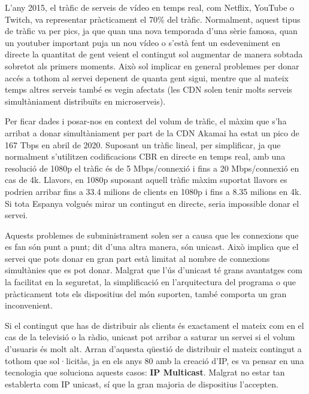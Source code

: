 {    L'any 2015, el tràfic de serveis de vídeo en temps real, com Netflix, YouTube o Twitch, va representar pràcticament el 70\% del tràfic. Normalment,
    aquest tipus de tràfic va per pics, ja que quan una nova temporada d'una sèrie famosa, quan un youtuber important puja un nou vídeo o s'està
    fent un esdeveniment en directe la quantitat de gent veient el contingut sol augmentar de manera sobtada sobretot als primers moments. Això sol implicar
    en general problemes per donar accés a tothom al servei depenent de quanta gent sigui, mentre que al mateix temps altres serveis també es vegin
    afectats (les \ac{CDN} solen tenir molts serveis simultàniament distribuïts en microserveis).
    
    Per ficar dades i posar-nos en context del volum de tràfic, el màxim que s'ha arribat a donar simultàniament per part de la \ac{CDN} Akamai
    ha estat un pico de 167 Tbps en abril de 2020. Suposant un tràfic lineal, per simplificar, ja que normalment s'utilitzen codificacions \ac{CBR}
    en directe en temps real, amb una resolució de 1080p el tràfic és de 5 Mbps/connexió i fins a 20 Mbps/connexió en cas de 4k. Llavors, en 1080p
    suposant aquell tràfic màxim suportat llavors es podrien arribar fins a 33.4 milions de clients en 1080p i fins a 8.35 milions en 4k. Si tota
    Espanya volgués mirar un contingut en directe, seria impossible donar el servei.
    
    Aquests problemes de subministrament solen ser a causa que les connexions que es fan són punt a punt; dit d'una altra manera,
    són unicast. Això implica que el servei que pots donar en gran part està limitat al nombre de connexions simultànies que es pot donar. Malgrat que
    l'ús d'unicast té grans avantatges com la facilitat en la seguretat, la simplificació en l'arquitectura del programa o que pràcticament tots els
    dispositius del món suporten, també comporta un gran inconvenient.
    
    Si el contingut que has de distribuir als clients és exactament el mateix com en el cas de la televisió o la ràdio, unicast pot arribar a saturar
    un servei si el volum d'usuaris és molt alt. Arran d'aquesta qüestió de distribuir el mateix contingut a tothom que sol·licitàs, ja en
    els anys 80 amb la creació d'\ac{IP}, es va pensar en una tecnologia que soluciona aquests casos: \textbf{IP Multicast}. Malgrat no estar tan
    establerta com IP unicast, sí que la gran majoria de dispositius l'accepten.
    
}
